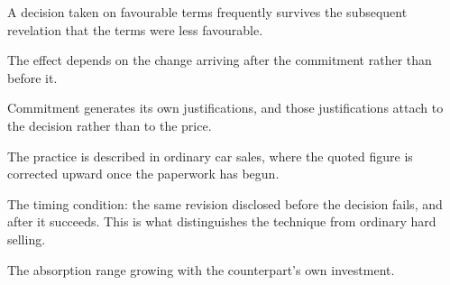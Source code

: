 

\begin{distilled}
  \item A decision taken on favourable terms frequently survives the subsequent revelation that the terms were less favourable.
  \item The effect depends on the change arriving after the commitment rather than before it.
  \item Commitment generates its own justifications, and those justifications attach to the decision rather than to the price.
  \item The practice is described in ordinary car sales, where the quoted figure is corrected upward once the paperwork has begun.
\end{distilled}

\begin{unique}
  \item The timing condition: the same revision disclosed before the decision fails, and after it succeeds. This is what distinguishes the technique from ordinary hard selling.
  \item The absorption range growing with the counterpart's own investment.
\end{unique}
